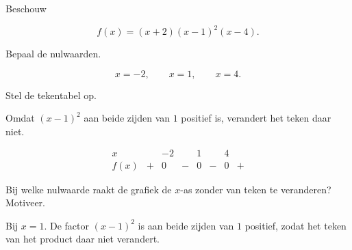 \documentclass{ximera}
\begin{document}
\begin{oefening}{\oefU\ESS}

Beschouw

\[
f(x)=(x+2)(x-1)^2(x-4).
\]

\begin{question}
Bepaal de nulwaarden.

\begin{oplossing}
\[
x=-2,\qquad x=1,\qquad x=4.
\]
\end{oplossing}
\end{question}

\begin{question}
Stel de tekentabel op.

\begin{oplossing}
Omdat \((x-1)^2\) aan beide zijden van \(1\) positief is,
verandert het teken daar niet.

\[
\begin{array}{c|ccccccc}
x &  & -2 &  & 1 &  & 4 & \\
\hline
f(x)&+&0&-&0&-&0&+
\end{array}
\]
\end{oplossing}
\end{question}

\begin{question}
Bij welke nulwaarde raakt de grafiek de \(x\)-as zonder van teken te veranderen?
Motiveer.

\begin{oplossing}
Bij \(x=1\).
De factor \((x-1)^2\) is aan beide zijden van \(1\) positief,
zodat het teken van het product daar niet verandert.
\end{oplossing}
\end{question}

\end{oefening}
\end{document}
